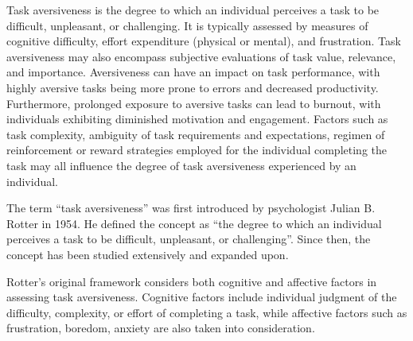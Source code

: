 

Task aversiveness is the degree to which an individual perceives a task to be difficult, unpleasant, or challenging. It is typically assessed by measures of cognitive difficulty, effort expenditure (physical or mental), and frustration. Task aversiveness may also encompass subjective evaluations of task value, relevance, and importance. Aversiveness can have an impact on task performance, with highly aversive tasks being more prone to errors and decreased productivity. Furthermore, prolonged exposure to aversive tasks can lead to burnout, with individuals exhibiting diminished motivation and engagement. Factors such as task complexity, ambiguity of task requirements and expectations, regimen of reinforcement or reward strategies employed for the individual completing the task may all influence the degree of task aversiveness experienced by an individual.

The term “task aversiveness” was first introduced by psychologist Julian B. Rotter in 1954. He defined the concept as “the degree to which an individual perceives a task to be difficult, unpleasant, or challenging”. Since then, the concept has been studied extensively and expanded upon.

Rotter's original framework considers both cognitive and affective factors in assessing task aversiveness. Cognitive factors include individual judgment of the difficulty, complexity, or effort of completing a task, while affective factors such as frustration, boredom, anxiety are also taken into consideration.
\cite{Rotter1954}